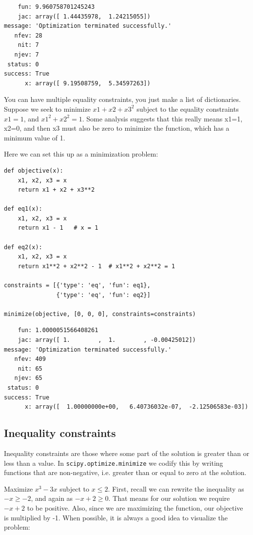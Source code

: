 \documentclass[11pt]{article}
\begin{document}
\begin{verbatim}
    fun: 9.960758701245243
    jac: array([ 1.44435978,  1.24215055])
message: 'Optimization terminated successfully.'
   nfev: 28
    nit: 7
   njev: 7
 status: 0
success: True
      x: array([ 9.19508759,  5.34597263])
\end{verbatim}


You can have multiple equality constraints, you just make a list of dictionaries. Suppose we seek to minimize \(x1 + x2 + x3^2\) subject to the equality constraints \(x1=1\), and \(x1^2 + x2^2 = 1\). Some analysis suggests that this really means x1=1, x2=0, and then x3 must also be zero to minimize the function, which has a minimum value of 1.


Here we can set this up as a minimization problem:

\begin{verbatim}
def objective(x):
    x1, x2, x3 = x
    return x1 + x2 + x3**2

def eq1(x):
    x1, x2, x3 = x
    return x1 - 1   # x = 1

def eq2(x):
    x1, x2, x3 = x
    return x1**2 + x2**2 - 1  # x1**2 + x2**2 = 1

constraints = [{'type': 'eq', 'fun': eq1},
               {'type': 'eq', 'fun': eq2}]

minimize(objective, [0, 0, 0], constraints=constraints)
\end{verbatim}

\begin{verbatim}
    fun: 1.0000051566408261
    jac: array([ 1.        ,  1.        , -0.00425012])
message: 'Optimization terminated successfully.'
   nfev: 409
    nit: 65
   njev: 65
 status: 0
success: True
      x: array([  1.00000000e+00,   6.40736032e-07,  -2.12506583e-03])
\end{verbatim}

\subsection{Inequality constraints}
\label{sec:org841acc1}

Inequality constraints are those where some part of the solution is greater than or less than a value. In \texttt{scipy.optimize.minimize} we codify this by writing functions that are non-negative, i.e. greater than or equal to zero at the solution.

Maximize \(x^3 - 3x\) subject to \(x \le 2\). First, recall we can rewrite the inequality as \(-x \ge -2\), and again as \(-x + 2 \ge 0\). That means for our solution we require \(-x+2\) to be positive. Also, since we are maximizing the function, our objective is multiplied by -1. When possible, it is always a good idea to visualize the problem:
\end{document}
